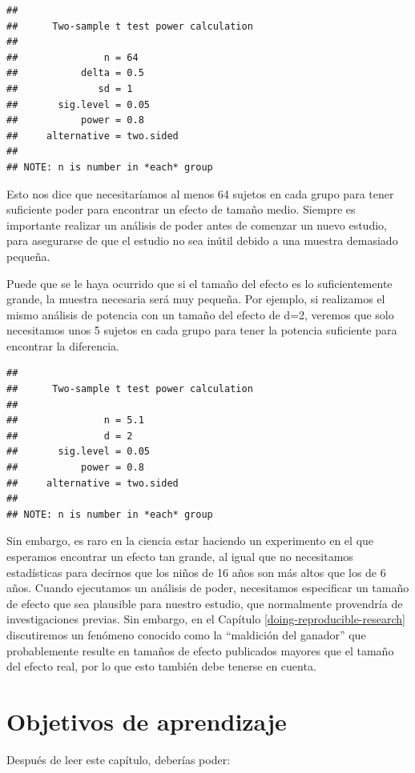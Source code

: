 \documentclass[
  12pt,
]{book}
\theoremstyle{definition}
\theoremstyle{definition}
\theoremstyle{definition}
\theoremstyle{remark}
\begin{document}
\begin{verbatim}
## 
##      Two-sample t test power calculation 
## 
##               n = 64
##           delta = 0.5
##              sd = 1
##       sig.level = 0.05
##           power = 0.8
##     alternative = two.sided
## 
## NOTE: n is number in *each* group
\end{verbatim}

Esto nos dice que necesitaríamos al menos 64 sujetos en cada grupo para tener suficiente poder para encontrar un efecto de tamaño medio. Siempre es importante realizar un análisis de poder antes de comenzar un nuevo estudio, para asegurarse de que el estudio no sea inútil debido a una muestra demasiado pequeña.

Puede que se le haya ocurrido que si el tamaño del efecto es lo suficientemente grande, la muestra necesaria será muy pequeña. Por ejemplo, si realizamos el mismo análisis de potencia con un tamaño del efecto de d=2, veremos que solo necesitamos unos 5 sujetos en cada grupo para tener la potencia suficiente para encontrar la diferencia.

\begin{verbatim}
## 
##      Two-sample t test power calculation 
## 
##               n = 5.1
##               d = 2
##       sig.level = 0.05
##           power = 0.8
##     alternative = two.sided
## 
## NOTE: n is number in *each* group
\end{verbatim}

Sin embargo, es raro en la ciencia estar haciendo un experimento en el que esperamos encontrar un efecto tan grande, al igual que no necesitamos estadísticas para decirnos que los niños de 16 años son más altos que los de 6 años. Cuando ejecutamos un análisis de poder, necesitamos especificar un tamaño de efecto que sea plausible para nuestro estudio, que normalmente provendría de investigaciones previas. Sin embargo, en el Capítulo \ref{doing-reproducible-research} discutiremos un fenómeno conocido como la ``maldición del ganador'' que probablemente resulte en tamaños de efecto publicados mayores que el tamaño del efecto real, por lo que esto también debe tenerse en cuenta.

\hypertarget{objetivos-de-aprendizaje}{%
\section{Objetivos de aprendizaje}\label{objetivos-de-aprendizaje}}

Después de leer este capítulo, deberías poder:
\end{document}
